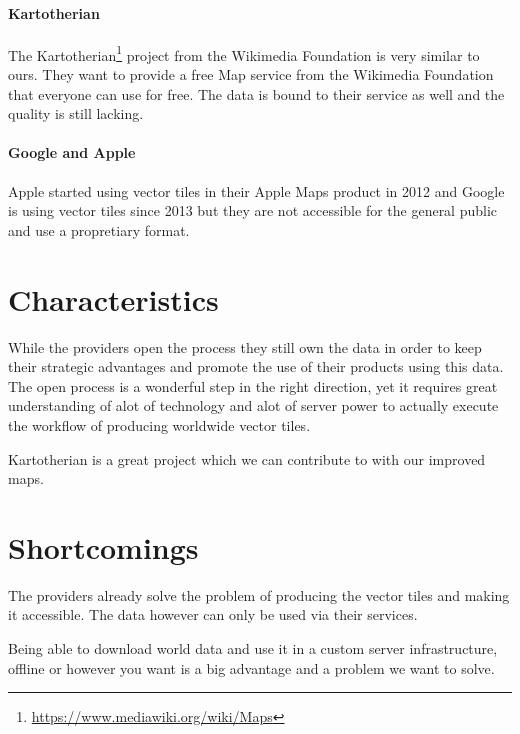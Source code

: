 \paragraph{Kartotherian}

The Kartotherian\footnote{\url{https://www.mediawiki.org/wiki/Maps}} project from the Wikimedia Foundation is very similar to ours. They want to provide a free Map service from the Wikimedia Foundation that everyone can use for free. The data is bound to their service as well and the quality is still lacking.

\paragraph{Google and Apple }

Apple started using vector tiles in their Apple Maps product in 2012\cite{wiki:apple-maps}  and  Google is using vector tiles since 2013\cite{wiki:google-maps} but they are not accessible for the general public and use a propretiary format.

\section{Characteristics}

While the providers open the process they still own the data in order
to keep their strategic advantages and promote the use
of their products using this data. The open process is a wonderful
step in the right direction, yet it requires great understanding
of alot of technology and alot of server power to actually
execute the workflow of producing worldwide vector tiles.

Kartotherian is a great project which we can contribute to with
our improved maps.

\section{Shortcomings}

The providers already solve the problem of producing the vector tiles
and making it accessible. The data however can only be used
via their services.

Being able to download world data and use it in a custom server
infrastructure, offline or however you want is a big advantage
and a problem we want to solve.
